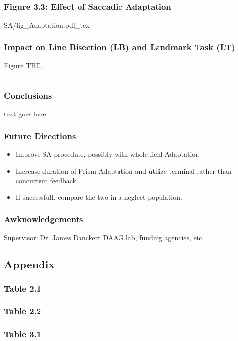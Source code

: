\documentclass{beamer}
\begin{document}
\begin{frame}
	\frametitle{Figure 3.3: Effect of Saccadic Adaptation}
	\centering
	\def\svgwidth{0.9\textwidth}
	\tiny
	{SA/fig_Adaptation.pdf_tex}
\end{frame}

\begin{frame}
	\frametitle{Impact on Line Bisection (LB) and Landmark Task (LT)}
	Figure TBD.
\end{frame}


\section*{}
\begin{frame}
	\frametitle{Conclusions}
	text goes here
\end{frame}

\begin{frame}
	\frametitle{Future Directions}
	\begin{itemize}
		\item Improve SA procedure, possibly with whole-field Adaptation
		\item Increase duration of Prism Adaptation and utilize terminal rather than concurrent feedback.
		\item If successfull, compare the two in a neglect population.
	\end{itemize}
\end{frame}

\begin{frame}
	\frametitle{Awknowledgements}
	Supervisor: Dr. James Danckert
	DAAG lab, funding agencies, etc.
\end{frame}


\subsection*{Appendix}
\begin{frame}[noframenumbering]
	\frametitle{Table 2.1}
\end{frame}

\begin{frame}[noframenumbering]
	\frametitle{Table 2.2}
	
\end{frame}

\begin{frame}[noframenumbering]
	\frametitle{Table 3.1}
	\tiny
	\centering
	\setlength{\tabcolsep}{5pt}
	
\end{frame}
\end{document}
